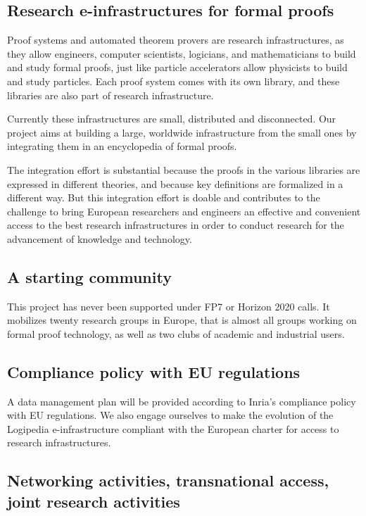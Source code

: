 \subsection{Research e-infrastructures for formal proofs}

Proof systems and automated theorem provers are research
infrastructures, as they allow engineers, computer scientists, logicians, and
mathematicians to build and study formal proofs, just like particle
accelerators allow physicists to build and study particles. Each proof
system comes with its own library, and these libraries are also
part of research infrastructure.

Currently these infrastructures are small, distributed and
disconnected.  Our project aims at building a large, worldwide
infrastructure from the small ones by integrating them in an
encyclopedia of formal proofs.

The integration effort is substantial because the proofs in the
various libraries are expressed in different theories, and because
key definitions are formalized in a different way.
%
But this
integration effort is doable and contributes to the challenge to bring
European researchers and engineers an effective and convenient access
to the best research infrastructures in order to conduct research for
the advancement of knowledge and technology.

\subsection{A starting community}

This project has never been supported under FP7 or Horizon 2020 calls.
It mobilizes twenty research groups in Europe, that is almost all
groups working on formal proof technology, as well as two clubs of
academic and industrial users.

\subsection{Compliance policy with EU regulations}

A data management plan will be provided according to Inria’s
compliance policy with EU regulations. We also engage ourselves to
make the evolution of the {\sc Logipedia} e-infrastructure compliant
with the European charter for access to research infrastructures.

\subsection{Networking activities, transnational access, joint
  research activities}

